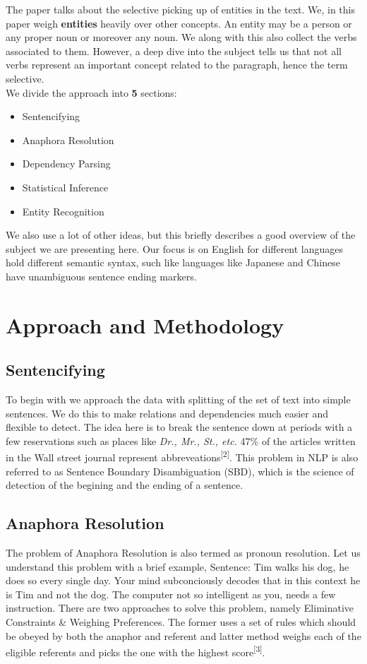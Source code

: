\documentclass[conference]{IEEEtran}
\begin{document}
The paper talks about the selective picking up of entities in the text. We, in this paper weigh \textbf{entities} heavily over other concepts. An entity may be a person or any proper noun or moreover any noun. We along with this also collect the verbs associated to them. However, a deep dive into the subject tells us that not all verbs represent an important concept related to the paragraph, hence the term selective.\\
We divide the approach into \textbf{5} sections:
\begin{itemize}
\item Sentencifying
\item Anaphora Resolution
\item Dependency Parsing
\item Statistical Inference
\item Entity Recognition
\end{itemize}

We also use a lot of other ideas, but this briefly describes a good overview of the subject we are presenting here. Our focus is on English for different languages hold different semantic syntax, such like languages like Japanese and Chinese have unambiguous sentence ending markers.

\section{Approach and Methodology}

\subsection{Sentencifying}
To begin with we approach the data with splitting of the set of text into simple sentences.
We do this to make relations and dependencies much easier and flexible to detect. The idea here is to break the sentence down at periods with a few reservations such as places like \textit{Dr., Mr., St., etc.} 47\% of the articles written in the Wall street journal represent abbreveations\textsuperscript{[2]}. This problem in NLP is also referred to as Sentence Boundary Disambiguation (SBD), which is the science of detection of the begining and the ending of a sentence.

\subsection{Anaphora Resolution}
The problem of Anaphora Resolution is also termed as pronoun resolution. Let us understand this problem with a brief example, Sentence: Tim walks his dog, he does so every single day. Your mind subconciously decodes that in this context he is Tim and not the dog. The computer not so intelligent as you, needs a few instruction. There are two approaches to solve this problem, namely Eliminative Constraints \& Weighing Preferences. The former uses a set of rules which should be obeyed by both the anaphor and referent and latter method weighs each of the eligible referents and picks the one with the highest score\textsuperscript{[3]}.
\end{document}
